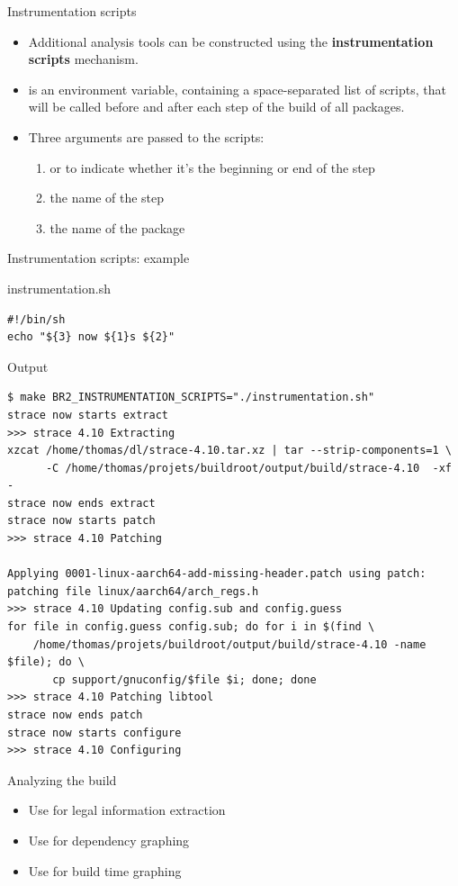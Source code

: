 \begin{frame}{Instrumentation scripts}
  \begin{itemize}
  \item Additional analysis tools can be constructed using the {\bf
      instrumentation scripts} mechanism.
  \item {} is an environment variable,
    containing a space-separated list of scripts, that will be called
    before and after each step of the build of all packages.
  \item Three arguments are passed to the scripts:
    \begin{enumerate}
    \item {} or  to indicate whether it's the
      beginning or end of the step
    \item the name of the step
    \item the name of the package
    \end{enumerate}
  \end{itemize}
\end{frame}

\begin{frame}[fragile]{Instrumentation scripts: example}
  \begin{block}{instrumentation.sh}
{\tiny
\begin{verbatim}
#!/bin/sh
echo "${3} now ${1}s ${2}"
\end{verbatim}}
  \end{block}

  \begin{block}{Output}
{\tiny
\begin{verbatim}
$ make BR2_INSTRUMENTATION_SCRIPTS="./instrumentation.sh"
strace now starts extract
>>> strace 4.10 Extracting
xzcat /home/thomas/dl/strace-4.10.tar.xz | tar --strip-components=1 \
      -C /home/thomas/projets/buildroot/output/build/strace-4.10  -xf -
strace now ends extract
strace now starts patch
>>> strace 4.10 Patching

Applying 0001-linux-aarch64-add-missing-header.patch using patch: 
patching file linux/aarch64/arch_regs.h
>>> strace 4.10 Updating config.sub and config.guess
for file in config.guess config.sub; do for i in $(find \
    /home/thomas/projets/buildroot/output/build/strace-4.10 -name $file); do \
       cp support/gnuconfig/$file $i; done; done
>>> strace 4.10 Patching libtool
strace now ends patch
strace now starts configure
>>> strace 4.10 Configuring
\end{verbatim}}
  \end{block}

\end{frame}

\setuplabframe
{Analyzing the build}
{
  \begin{itemize}
  \item Use  for legal information extraction
  \item Use  for dependency graphing
  \item Use  for build time graphing
  \end{itemize}
}

